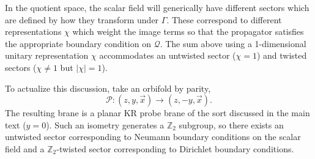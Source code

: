 \documentclass[reprint,amsmath,amssymb,aps,nofootinbib,twocolumn]{revtex4-2}
\begin{document}
\begin{appendix}
In the quotient space, the scalar field will generically have different sectors which are defined by how they transform under $\Gamma$. These correspond to different representations $\chi$ which weight the image terms so that the propagator satisfies the appropriate boundary condition on $\mathcal{Q}$. The sum above using a 1-dimensional unitary representation $\chi$ accommodates an untwisted sector ($\chi = 1$) and twisted sectors ($\chi \neq 1$ but $|\chi|= 1$).

To actualize this discussion, take an orbifold by parity,
\begin{equation}
\mathcal{P}: (z,y,\vec{x}) \to (z,-y,\vec{x}).
\end{equation}
The resulting brane is a planar KR probe brane of the sort discussed in the main text ($y = 0$). Such an isometry generates a $\mathbb{Z}_2$ subgroup, so there exists an untwisted sector corresponding to Neumann boundary conditions on the scalar field and a $\mathbb{Z}_2$-twisted sector corresponding to Dirichlet boundary conditions.


\end{appendix}
\end{document}

